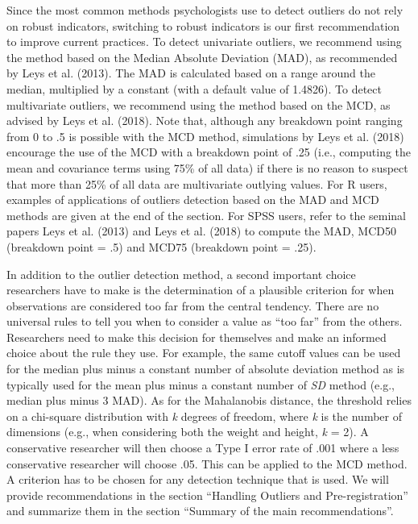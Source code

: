 \documentclass[man,floatsintext]{apa6}
\begin{document}
Since the most common methods psychologists use to detect outliers do not rely on robust indicators, switching to robust indicators is our first recommendation to improve current practices. To detect univariate outliers, we recommend using the method based on the Median Absolute Deviation (MAD), as recommended by Leys et al. (2013). The MAD is calculated based on a range around the median, multiplied by a constant (with a default value of 1.4826). To detect multivariate outliers, we recommend using the method based on the MCD, as advised by Leys et al. (2018). Note that, although any breakdown point ranging from 0 to .5 is possible with the MCD method, simulations by Leys et al. (2018) encourage the use of the MCD with a breakdown point of .25 (i.e., computing the mean and covariance terms using 75\% of all data) if there is no reason to suspect that more than 25\% of all data are multivariate outlying values. For R users, examples of applications of outliers detection based on the MAD and MCD methods are given at the end of the section. For SPSS users, refer to the seminal papers Leys et al. (2013) and Leys et al. (2018) to compute the MAD, MCD50 (breakdown point = .5) and MCD75 (breakdown point = .25).

In addition to the outlier detection method, a second important choice researchers have to make is the determination of a plausible criterion for when observations are considered too far from the central tendency. There are no universal rules to tell you when to consider a value as \enquote{too far} from the others. Researchers need to make this decision for themselves and make an informed choice about the rule they use. For example, the same cutoff values can be used for the median plus minus a constant number of absolute deviation method as is typically used for the mean plus minus a constant number of \emph{SD} method (e.g., median plus minus 3 MAD). As for the Mahalanobis distance, the threshold relies on a chi-square distribution with \emph{k} degrees of freedom, where \emph{k} is the number of dimensions (e.g., when considering both the weight and height, \emph{k }= 2). A conservative researcher will then choose a Type I error rate of .001 where a less conservative researcher will choose .05. This can be applied to the MCD method. A criterion has to be chosen for any detection technique that is used. We will provide recommendations in the section \enquote{Handling Outliers and Pre-registration} and summarize them in the section \enquote{Summary of the main recommendations}.
\end{document}
